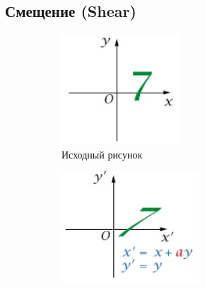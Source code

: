 \documentclass[a4paper, 14pt]{extarticle}
\begin{document}
\subsection{Смещение (Shear)}
\begin{figure}[h]
	\centering
	\begin{subfigure}[b]{0.3\textwidth}
		\centering
		\includegraphics[width=\textwidth]{l3/S014.jpg}
		\caption{Исходный рисунок}
	\end{subfigure}
	\begin{subfigure}[b]{0.3\textwidth}
		\centering
		\includegraphics[width=\textwidth]{l3/S015.jpg}

\end{subfigure}
\end{figure}
\end{document}
